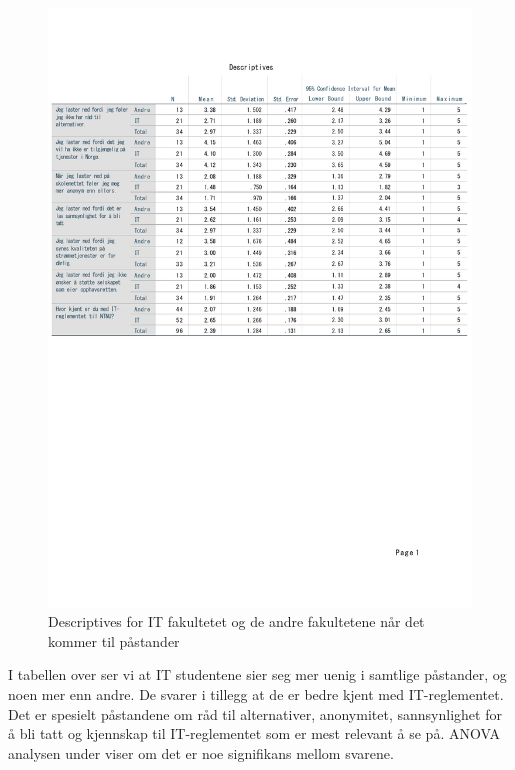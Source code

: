 \begin{figure}[H]
    \centering
    \includegraphics[scale=0.6]{case_1/bilder/fakultet_pastander_descriptive.pdf}
    \caption[Descriptives av fakultetene på påstander]{Descriptives for IT fakultetet og de andre fakultetene når det kommer til påstander}
    \label{fig:fakultet_pastander_descriptive}
\end{figure}

I tabellen over ser vi at IT studentene sier seg mer uenig i samtlige påstander, og noen mer enn andre. De svarer i tillegg at de er bedre kjent med IT-reglementet. Det er spesielt påstandene om råd til alternativer, anonymitet, sannsynlighet for å bli tatt og kjennskap til IT-reglementet som er mest relevant å se på. ANOVA analysen under viser om det er noe signifikans mellom svarene. 


